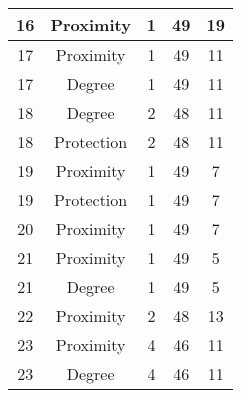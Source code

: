 \documentclass[results.tex]{subfiles}
\begin{document}
\begin{center}
\begin{tabular}{| c || c | c | c | c |}
            \hline
            16                      & Proximity                    & 1                      & 49                      & 19                   \\
            \hline
            17                      & Proximity                    & 1                      & 49                      & 11                   \\
            \hline
            17                      & Degree                       & 1                      & 49                      & 11                   \\
            \hline
            18                      & Degree                       & 2                      & 48                      & 11                   \\
            \hline
            18                      & Protection                   & 2                      & 48                      & 11                   \\
            \hline
            19                      & Proximity                    & 1                      & 49                      & 7                    \\
            \hline
            19                      & Protection                   & 1                      & 49                      & 7                    \\
            \hline
            20                      & Proximity                    & 1                      & 49                      & 7                    \\
            \hline
            21                      & Proximity                    & 1                      & 49                      & 5                    \\
            \hline
            21                      & Degree                       & 1                      & 49                      & 5                    \\
            \hline
            22                      & Proximity                    & 2                      & 48                      & 13                   \\
            \hline
            23                      & Proximity                    & 4                      & 46                      & 11                   \\
            \hline
            23                      & Degree                       & 4                      & 46                      & 11                   \\

\end{tabular}
\end{center}
\end{document}
